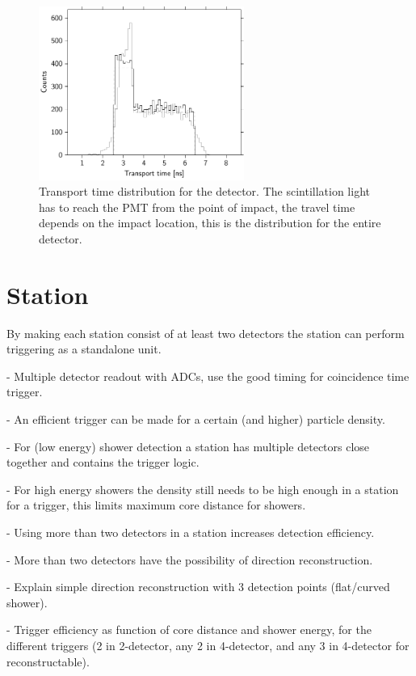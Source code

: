 \begin{figure}
    \centering
    \includegraphics[width=0.6\textwidth]
                    {plots/experiment/transport_time}
    \caption{Transport time distribution for the detector. The scintillation light has to reach the PMT from the point of impact, the travel time depends on the impact location, this is the distribution for the entire detector.}
    \label{fig:transport_time}
\end{figure}


\section{Station}

By making each station consist of at least two detectors the station can perform triggering as a standalone unit.

- Multiple detector readout with ADCs, use the good timing for coincidence time trigger.

- An efficient trigger can be made for a certain (and higher) particle density.

- For (low energy) shower detection a station has multiple detectors close together and contains the trigger logic.

- For high energy showers the density still needs to be high enough in a station for a trigger, this limits maximum core distance for showers.

- Using more than two detectors in a station increases detection efficiency.

- More than two detectors have the possibility of direction reconstruction.

- Explain simple direction reconstruction with 3 detection points (flat/curved shower).

- Trigger efficiency as function of core distance and shower energy, for the different triggers (2 in 2-detector, any 2 in 4-detector, and any 3 in 4-detector for reconstructable).

